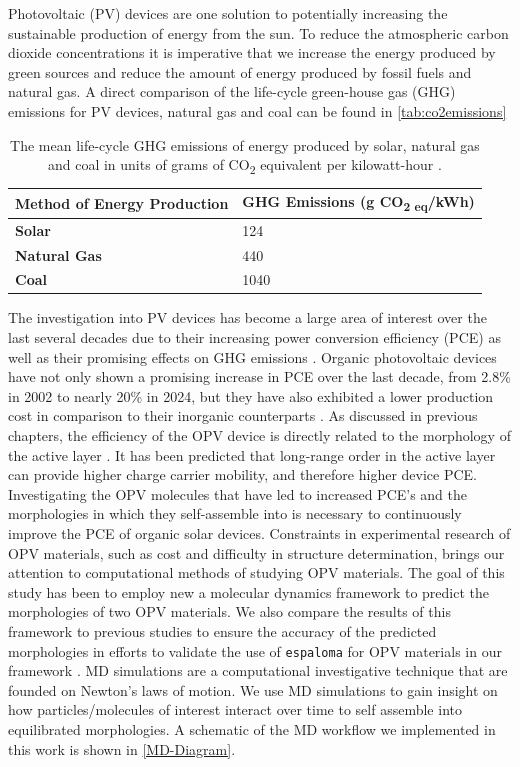 Photovoltaic (PV) devices are one solution to potentially increasing the sustainable production of energy from the sun. To reduce the atmospheric carbon dioxide concentrations it is imperative that we increase the energy produced by green sources and reduce the amount of energy produced by fossil fuels and natural gas. A direct comparison of the life-cycle green-house gas (GHG) emissions for PV devices, natural gas and coal can be found in \autoref{tab:co2emissions}
\begin{table}[h]
    \centering
    \begin{tabular}{ll}
            \textbf{Method of Energy Production} & \textbf{GHG Emissions (g CO\textsubscript{2 eq}/kWh)} \\
    \hline
         \textbf{Solar}         &   124 \\
         \textbf{Natural Gas}   &   440 \\
         \textbf{Coal}          &   1040\\ 
    \end{tabular}
    \caption{The mean life-cycle GHG emissions of energy produced by solar, natural gas and coal in units of grams of CO\textsubscript{2} equivalent per kilowatt-hour \citep{MEHEDI2022118918,ghg_emissions}.}
    \label{tab:co2emissions}
\end{table}
\par The investigation into PV devices has become a large area of interest over the last several decades due to their increasing power conversion efficiency (PCE) as well as their promising effects on GHG emissions \citep{MEHEDI2022118918, ghg_emissions}. Organic photovoltaic devices have not only shown a promising increase in PCE over the last decade, from 2.8\% in 2002 to nearly 20\% in 2024, but they have also exhibited a lower production cost in comparison to their inorganic counterparts \citep{sondergaard_roll--roll_2012,Basu2024,Wang2021,Schilinsky2002}. As discussed in previous chapters, the efficiency of the OPV device is directly related to the morphology of the active layer \citep{mazzio_future_2015}. It has been predicted that long-range order in the active layer can provide higher charge carrier mobility, and therefore higher device PCE. Investigating the OPV molecules that have led to increased PCE's and the morphologies in which they self-assemble into is necessary to continuously improve the PCE of organic solar devices. Constraints in experimental research of OPV materials, such as cost and difficulty in structure determination, brings our attention to computational methods of studying OPV materials. The goal of this study has been to employ new a molecular dynamics framework to predict the morphologies of two OPV materials. We also compare the results of this framework to previous studies to ensure the accuracy of the predicted morphologies in efforts to validate the use of \texttt{espaloma} for OPV materials in our framework \citep{wang_end--end_2022}. MD simulations are a computational investigative technique that are founded on Newton's laws of motion. We use MD simulations to gain insight on how particles/molecules of interest interact over time to self assemble into equilibrated morphologies. A schematic of the MD workflow we implemented in this work is shown in \autoref{MD-Diagram}. 


